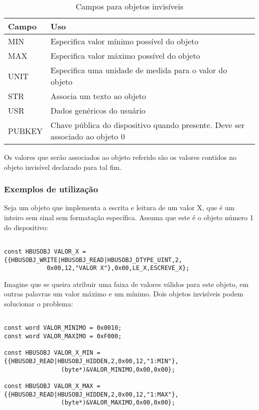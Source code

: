 \begin{table}[H]
\centering
\begin{tabular}{l l}
\hline
Campo		&		Uso\\
\hline
MIN			&		Especifica valor mínimo possível do objeto\\
MAX			&		Especifica valor máximo possível do objeto\\
UNIT			&		Especifica uma unidade de medida para o valor do objeto\\
STR			&		Associa um texto ao objeto\\
USR			&		Dados genéricos do usuário\\
PUBKEY		&		Chave pública do dispositivo quando presente. Deve ser associado ao objeto 0\\
\hline
\end{tabular}
\caption{Campos para objetos invisíveis}
\end{table}

Os valores que serão associados ao objeto referido são os valores contidos no objeto invisível declarado para tal fim.

\subsubsection*{Exemplos de utilização}

Seja um objeto que implementa a escrita e leitura de um valor X, que é um inteiro sem sinal sem formatação específica. Assuma que este é o objeto número 1 do dispositivo:

\begin{verbatim}

const HBUSOBJ VALOR_X = {{HBUSOBJ_WRITE|HBUSOBJ_READ|HBUSOBJ_DTYPE_UINT,2,
			0x00,12,"VALOR X"},0x00,LE_X,ESCREVE_X};

\end{verbatim}

Imagine que se queira atribuir uma faixa de valores válidos para este objeto, em outras palavras um valor máximo e um mínimo. Dois objetos invisíveis podem solucionar o problema:

\begin{verbatim}

const word VALOR_MINIMO = 0x0010;
const word VALOR_MAXIMO = 0xF000;

const HBUSOBJ VALOR_X_MIN = {{HBUSOBJ_READ|HBUSOBJ_HIDDEN,2,0x00,12,"1:MIN"},
				(byte*)&VALOR_MINIMO,0x00,0x00};
								
const HBUSOBJ VALOR_X_MAX = {{HBUSOBJ_READ|HBUSOBJ_HIDDEN,2,0x00,12,"1:MAX"},
				(byte*)&VALOR_MAXIMO,0x00,0x00};

\end{verbatim}

